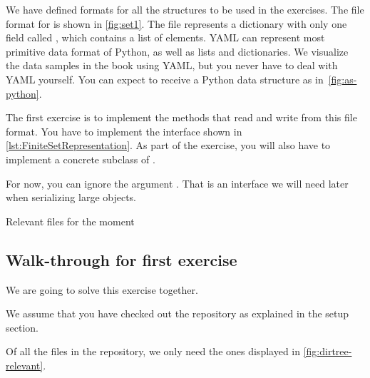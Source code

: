 We have defined formats for all the structures to be used in the exercises.
The file format for \FiniteSet is shown in \cref{fig:set1}.
The file represents a dictionary with only one field called , which contains a list of elements.
YAML can represent most primitive data format of Python, as well as lists and dictionaries.
We visualize the data samples in the book using YAML, but you never have to deal with YAML yourself.
You can expect to receive a Python data structure as in~\cref{fig:as-python}.

\begin{codeexercise}
    \label{ex:setrepr}
    The first exercise is to implement the methods that read and write from this file format.
    You have to implement the interface \FiniteSetRepresentation shown in \cref{lst:FiniteSetRepresentation}.
    As part of the exercise, you will also have to implement a concrete subclass of \FiniteSet.
\end{codeexercise}

\begin{longcode}
    \centering
    \caption{}\label{lst:FiniteSetRepresentation}
\end{longcode}

For now, you can ignore the argument .
That is an interface we will need later when serializing large objects.

%
\begin{marginfigure}
    \caption{Relevant files for the moment}
    \label{fig:dirtree-relevant}
\end{marginfigure}

\subsection{Walk-through for first exercise}

We are going to solve this exercise together.

We assume that you have checked out the repository as explained in the setup section.

Of all the files in the repository, we only need the ones displayed in \cref{fig:dirtree-relevant}.
%
%


